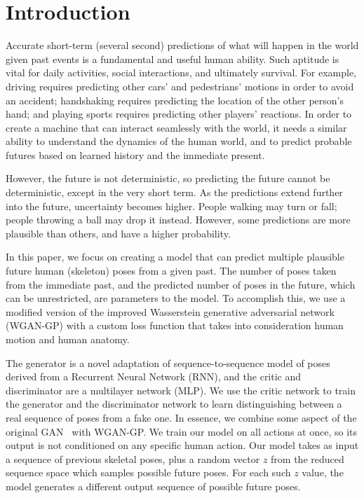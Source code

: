 \documentclass[10pt,twocolumn,letterpaper]{article}
\begin{document}
\section{Introduction}

Accurate short-term (several second) predictions of what will happen in the world given past events is a fundamental and useful human ability. Such aptitude is vital for daily activities, social interactions, and ultimately survival. For example, driving requires predicting other cars' and pedestrians' motions in order to avoid an accident; handshaking requires predicting the location of the other person's hand; and playing sports requires predicting other players' reactions. In order to create a machine that can interact seamlessly with the world, it needs a similar ability to understand the dynamics of the human world, and to predict probable futures based on learned history and the immediate present.

However, the future is not deterministic, so predicting the future cannot be deterministic, except in the very short term. As the predictions extend further into the future, uncertainty becomes higher. People walking may turn or fall; people throwing a ball may drop it instead.  However, some predictions are more plausible than others, and have a higher probability.

In this paper, we focus on creating a model that can predict multiple plausible future human (skeleton) poses from a given past. The number of poses taken from the immediate past, and the predicted number of poses in the future, which can be unrestricted, are parameters to the model. To accomplish this, we use a modified version of the improved Wasserstein generative adversarial network (WGAN-GP)\cite{corr2017:Ishaan} with a custom loss function that takes into consideration human motion and human anatomy.

The generator is a novel adaptation of sequence-to-sequence model\cite{nips2014:Ilya} of poses derived from a Recurrent Neural Network (RNN), and the critic and discriminator are a multilayer network (MLP). We use the critic network to train the generator and the discriminator network to learn distinguishing between a real sequence of poses from a fake one. In essence, we combine some aspect of the original GAN~\cite{nips2014:Goodfellow} with WGAN-GP\cite{corr2017:Ishaan}. We train our model on all actions at once, so its output is not conditioned on any specific human action. Our model takes as input a sequence of previous skeletal poses, plus a random vector $z$ from the reduced sequence space which samples possible future poses. For each such $z$ value, the model generates a different output sequence of possible future poses.
\end{document}
